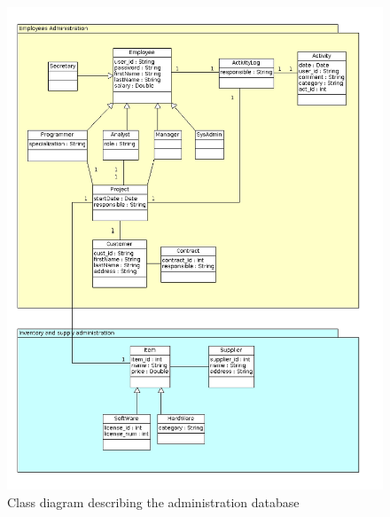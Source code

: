 \begin{figure}[H]
\centering
\includegraphics[scale=0.50]{assign3/argo/imgs/administrative.png}
\caption{Class diagram describing the administration database}
\label{3img:classadmin}
\end{figure}

